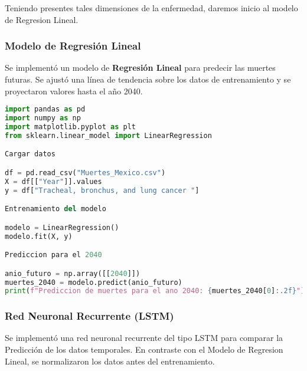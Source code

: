 Teniendo presentes tales dimensiones de la enfermedad, daremos inicio al modelo de Regresion Lineal.
\newpage
\subsubsection{Modelo de Regresión Lineal}
Se implementó un modelo de \textbf{Regresión Lineal} para predecir las muertes futuras. Se ajustó una línea de tendencia sobre los datos de entrenamiento y se proyectaron valores hasta el año 2040.

\begin{lstlisting}[language=Python, caption=Código de Regresion Lineal]
import pandas as pd
import numpy as np
import matplotlib.pyplot as plt
from sklearn.linear_model import LinearRegression

Cargar datos

df = pd.read_csv("Muertes_Mexico.csv")
X = df[["Year"]].values
y = df["Tracheal, bronchus, and lung cancer "]

Entrenamiento del modelo

modelo = LinearRegression()
modelo.fit(X, y)

Prediccion para el 2040

anio_futuro = np.array([[2040]])
muertes_2040 = modelo.predict(anio_futuro)
print(f"Prediccion de muertes para el ano 2040: {muertes_2040[0]:.2f}")
\end{lstlisting}

\subsubsection{Red Neuronal Recurrente (LSTM)}

Se implementó una red neuronal recurrente del tipo LSTM para comparar la Predicción de los datos temporales. En contraste con el Modelo de Regresion Lineal, se normalizaron los datos antes del entrenamiento.



